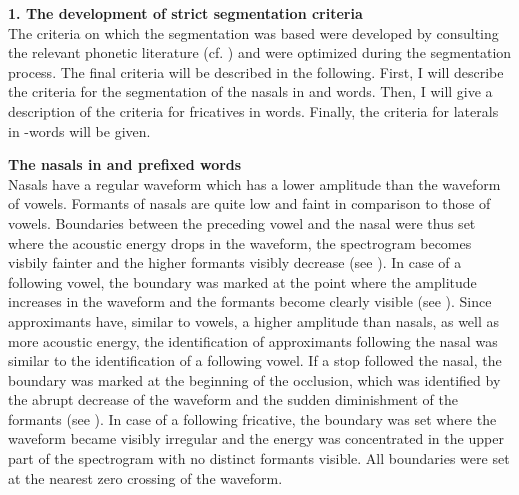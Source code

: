 \textbf{1. The development of strict segmentation criteria}\\

The criteria on which the segmentation was based were developed by consulting  the relevant phonetic literature (cf. \citealt{Ladefoged.1996,Johnson.1997b,Ladefoged.2003,Machac.2009,Ladefoged.2011}) and were optimized during the segmentation process. The final criteria will be described in the following. First, I will describe the criteria for the segmentation of the nasals in  and words. Then, I will give a description of the criteria for fricatives in words. Finally, the criteria for laterals in -words will be given.\\

\clearpage

\textbf{The nasals in  and prefixed words}\\

Nasals have a regular waveform which has a lower amplitude than the waveform of vowels. Formants of nasals are quite low and faint in comparison to those of vowels. Boundaries between the preceding vowel and the nasal were thus set where the acoustic energy drops in the waveform, the spectrogram becomes visbily fainter and the higher formants visibly decrease (see ). In case of a following vowel, the boundary was marked at the point where the amplitude increases in the waveform and the formants become clearly visible (see ).  Since approximants have, similar to vowels,  a higher amplitude than nasals, as well as more acoustic energy, the identification of approximants following the nasal was similar to the identification of a following vowel. If a stop followed the nasal, the boundary was marked at the beginning of the occlusion, which was identified by the abrupt decrease of the waveform and the sudden diminishment of the formants (see ). In case of a following fricative, the boundary was set where the waveform became visibly irregular and the energy was concentrated in the upper part of the spectrogram with no distinct formants visible. All boundaries were set at the nearest zero crossing of the waveform.\\


%	

